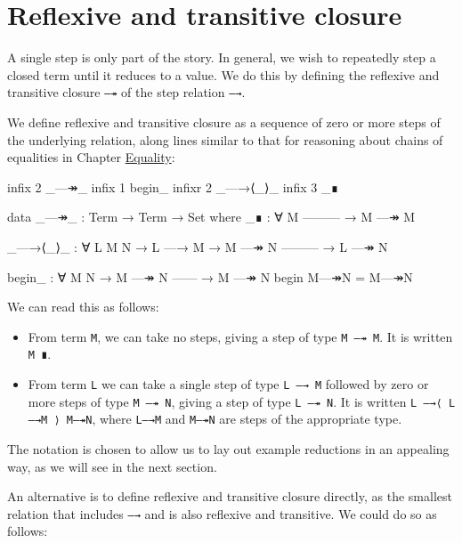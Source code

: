 \hypertarget{reflexive-and-transitive-closure}{%
\section{Reflexive and transitive
closure}\label{reflexive-and-transitive-closure}}

A single step is only part of the story. In general, we wish to
repeatedly step a closed term until it reduces to a value. We do this by
defining the reflexive and transitive closure \texttt{—↠} of the step
relation \texttt{—→}.

We define reflexive and transitive closure as a sequence of zero or more
steps of the underlying relation, along lines similar to that for
reasoning about chains of equalities in Chapter
\protect\hyperlink{Equality}{Equality}:

\begin{fence}
\begin{code}
infix  2 _—↠_
infix  1 begin_
infixr 2 _—→⟨_⟩_
infix  3 _∎

data _—↠_ : Term → Term → Set where
  _∎ : ∀ M
      ---------
    → M —↠ M

  _—→⟨_⟩_ : ∀ L {M N}
    → L —→ M
    → M —↠ N
      ---------
    → L —↠ N

begin_ : ∀ {M N}
  → M —↠ N
    ------
  → M —↠ N
begin M—↠N = M—↠N
\end{code}
\end{fence}

We can read this as follows:

\begin{itemize}
\item
  From term \texttt{M}, we can take no steps, giving a step of type
  \texttt{M\ —↠\ M}. It is written \texttt{M\ ∎}.
\item
  From term \texttt{L} we can take a single step of type
  \texttt{L\ —→\ M} followed by zero or more steps of type
  \texttt{M\ —↠\ N}, giving a step of type \texttt{L\ —↠\ N}. It is
  written \texttt{L\ —→⟨\ L—→M\ ⟩\ M—↠N}, where \texttt{L—→M} and
  \texttt{M—↠N} are steps of the appropriate type.
\end{itemize}

The notation is chosen to allow us to lay out example reductions in an
appealing way, as we will see in the next section.

An alternative is to define reflexive and transitive closure directly,
as the smallest relation that includes \texttt{—→} and is also reflexive
and transitive. We could do so as follows:

